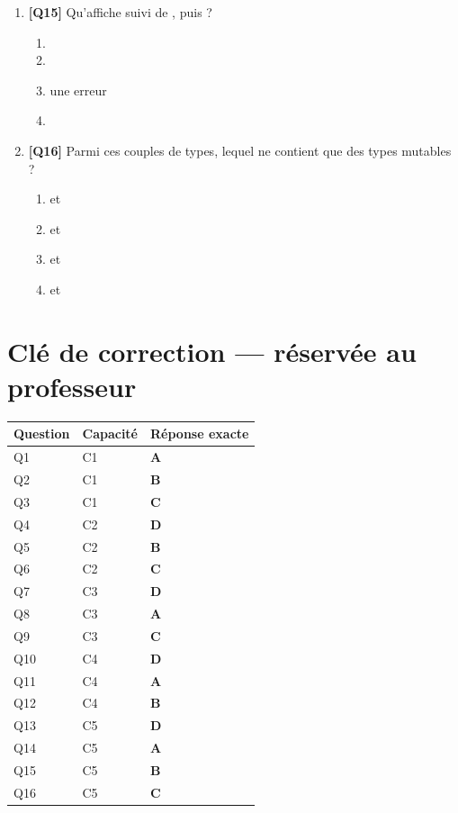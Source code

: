 \begin{enumerate}
\item \textbf{[Q15]} Qu'affiche  suivi de ,  puis  ?
  \begin{enumerate}[label=\Alph*.]
    \item \code{[1]}
    \item \code{[1, 9]}
    \item une erreur
    \item \code{[9]}
  \end{enumerate}

\item \textbf{[Q16]} Parmi ces couples de types, lequel ne contient que des types mutables ?
  \begin{enumerate}[label=\Alph*.]
    \item {} et 
    \item {} et 
    \item {} et 
    \item {} et 
  \end{enumerate}

\end{enumerate}

\ifnxVersionProfesseur
\clearpage
\section*{Clé de correction — réservée au professeur}

\begin{center}
\begin{tabular}{lll}
\hline
Question & Capacité & Réponse exacte \\
\hline
Q1 & C1 & \textbf{A} \\
Q2 & C1 & \textbf{B} \\
Q3 & C1 & \textbf{C} \\
Q4 & C2 & \textbf{D} \\
Q5 & C2 & \textbf{B} \\
Q6 & C2 & \textbf{C} \\
Q7 & C3 & \textbf{D} \\
Q8 & C3 & \textbf{A} \\
Q9 & C3 & \textbf{C} \\
Q10 & C4 & \textbf{D} \\
Q11 & C4 & \textbf{A} \\
Q12 & C4 & \textbf{B} \\
Q13 & C5 & \textbf{D} \\
Q14 & C5 & \textbf{A} \\
Q15 & C5 & \textbf{B} \\
Q16 & C5 & \textbf{C} \\
\hline
\end{tabular}
\end{center}

